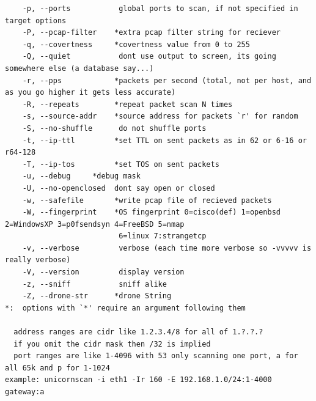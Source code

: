 \documentclass{article}
\begin{document}
\begin{lstlisting}
	-p, --ports           global ports to scan, if not specified in target options
	-P, --pcap-filter    *extra pcap filter string for reciever
	-q, --covertness     *covertness value from 0 to 255
	-Q, --quiet           dont use output to screen, its going somewhere else (a database say...)
	-r, --pps            *packets per second (total, not per host, and as you go higher it gets less accurate)
	-R, --repeats        *repeat packet scan N times
	-s, --source-addr    *source address for packets `r' for random
	-S, --no-shuffle      do not shuffle ports
	-t, --ip-ttl         *set TTL on sent packets as in 62 or 6-16 or r64-128
	-T, --ip-tos         *set TOS on sent packets
	-u, --debug		*debug mask
	-U, --no-openclosed	 dont say open or closed
	-w, --safefile       *write pcap file of recieved packets
	-W, --fingerprint    *OS fingerprint 0=cisco(def) 1=openbsd 2=WindowsXP 3=p0fsendsyn 4=FreeBSD 5=nmap
	                      6=linux 7:strangetcp
	-v, --verbose         verbose (each time more verbose so -vvvvv is really verbose)
	-V, --version         display version
	-z, --sniff           sniff alike
	-Z, --drone-str      *drone String
*:	options with `*' require an argument following them

  address ranges are cidr like 1.2.3.4/8 for all of 1.?.?.?
  if you omit the cidr mask then /32 is implied
  port ranges are like 1-4096 with 53 only scanning one port, a for all 65k and p for 1-1024
example: unicornscan -i eth1 -Ir 160 -E 192.168.1.0/24:1-4000 gateway:a
\end{lstlisting}
\end{document}
